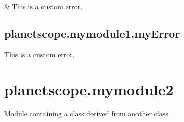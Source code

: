 \documentclass[letterpaper,10pt,english]{sphinxmanual}
\begin{document}
\begin{savenotes}\sphinxatlongtablestart\begin{longtable}[c]{}
\hline

\endfirsthead

%
{}\\
\hline

\endhead

\hline
{}\\
\endfoot

\endlastfoot

\sphinxAtStartPar
{\hyperref[\detokenize{_autosummary/planetscope.mymodule1.myError:planetscope.mymodule1.myError}]{}}
&
\sphinxAtStartPar
This is a custom error.
\\
\hline
\end{longtable}\sphinxatlongtableend\end{savenotes}


\subsection{planetscope.mymodule1.myError}
\label{\detokenize{_autosummary/planetscope.mymodule1.myError:planetscope-mymodule1-myerror}}\label{\detokenize{_autosummary/planetscope.mymodule1.myError::doc}}

\begin{fulllineitems}
\label{\detokenize{_autosummary/planetscope.mymodule1.myError:planetscope.mymodule1.myError}}
\sphinxAtStartPar
This is a custom error.

\end{fulllineitems}



\section{planetscope.mymodule2}
\label{\detokenize{_autosummary/planetscope.mymodule2:module-planetscope.mymodule2}}\label{\detokenize{_autosummary/planetscope.mymodule2:planetscope-mymodule2}}\label{\detokenize{_autosummary/planetscope.mymodule2::doc}}
\sphinxAtStartPar
Module containing a class derived from another class.
\end{document}
